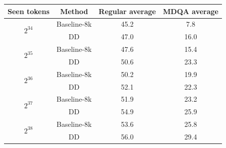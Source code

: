 \centering
    \resizebox{0.99\linewidth}{!}
    {
    \begin{tabular}{cc|cc}
    \toprule[1.5pt]
        {\bf Seen tokens} & {\bf Method} & {\bf Regular average} & {\bf MDQA average}\\
        \toprule[1pt]
        \multirow{2}{*}{$2^{34}$} & Baseline-8k& 45.2& 7.8\\
        & DD & 47.0&16.0 \\
        \midrule
        \multirow{2}{*}{$2^{35}$} & Baseline-8k&47.6& 15.4\\
        & DD &50.6 & 23.3\\
        \midrule
        \multirow{2}{*}{$2^{36}$} & Baseline-8k&50.2& 19.9\\
        & DD & 52.1 & 22.3 \\
        \midrule
        \multirow{2}{*}{$2^{37}$} & Baseline-8k&51.9& 23.2\\
        & DD &54.9 & 25.9\\
        \midrule
        \multirow{2}{*}{$2^{38}$} & Baseline-8k&53.6& 25.8\\
        & DD & 56.0 & 29.4\\
        \bottomrule[1pt]
    \end{tabular}
    }